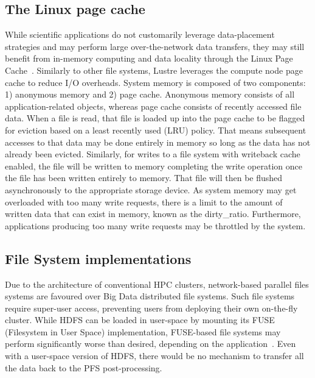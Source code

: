 \documentclass[10pt,journal,compsoc]{IEEEtran}
\begin{document}
\subsection{The Linux page cache}
 While scientific applications do not customarily leverage data-placement
      strategies and may perform large over-the-network data transfers, they may
      still benefit from in-memory computing and data locality through the Linux
      Page Cache~\cite{pagecache}. Similarly to other file systems, Lustre
      leverages the compute node page cache to reduce I/O overheads. System
      memory is composed of two components: 1) anonymous memory and 2) page
      cache. Anonymous memory consists of all application-related objects,
      whereas page cache consists of recently accessed file data. When a file is
      read, that file is loaded up into the page cache to be flagged for
      eviction based on a least recently used (LRU) policy. That means
      subsequent accesses to that data may be done entirely in memory so long as
      the data has not already been evicted. Similarly, for writes to a file
      system with writeback cache enabled, the file will be written to memory
      completing the write operation once the file has been written entirely to
      memory. That file will then be flushed asynchronously to the appropriate
      storage device. As system memory may get overloaded with too many write
      requests, there is a limit to the amount of written data that can exist in
      memory, known as the dirty\_ratio. Furthermore, applications producing too
      many write requests may be throttled by the system.

\subsection{File System implementations}
      Due to the architecture of conventional HPC clusters, network-based
      parallel files systems are favoured over Big Data distributed file
      systems. Such file systems require super-user access, preventing users
      from deploying their own on-the-fly cluster. While HDFS can be loaded in
      user-space by mounting its FUSE (Filesystem in User Space) implementation,
      FUSE-based file systems may perform significantly worse than desired,
      depending on the application~\cite{tofuse}. Even with a user-space version
      of HDFS, there would be no mechanism to transfer all the data back to the
      PFS post-processing.
      
\end{document}
